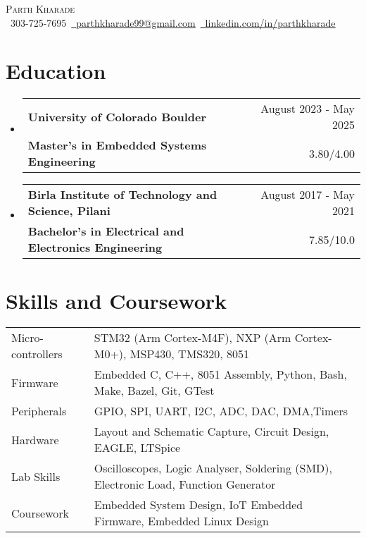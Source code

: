 \documentclass[11pt]{article}
\makeatletter
\newcommand{\resumeSubheading}[4]{
  \vspace{-2pt}\item
    \begin{tabular*}{1.0\textwidth}[t]{l@{\extracolsep{\fill}}r}
       {\large \textbf{#1}}&{\large #2} \\
      \textbf{#3}&{ #4} \\
    \end{tabular*}\vspace{-1pt}
}
\newcommand{\resumeSubHeadingListStart}{\begin{itemize}[leftmargin=0.0in, label={}]}
\newcommand{\resumeSubHeadingListEnd}{\end{itemize}}
\makeatother
\begin{document}
\setlength{\footskip}{4.1pt}
\begin{center}
  {\huge \scshape Parth Kharade} \\ \vspace{1pt}
  \small \raisebox{-0.1\height}\faPhone\ 303-725-7695{\hspace{0.1cm}}~\href{mailto:parthkharade99@gmail.com}{\raisebox{-0.2\height}\faEnvelope\ \underline{parthkharade99@gmail.com}}~{\hspace{0.1cm}}\href{https://www.linkedin.com/in/parth-k-081287184/}{\raisebox{-0.2\height}\faLinkedin\ \underline{linkedin.com/in/parthkharade}}
  \vspace{-10pt}
\end{center}


\section {Education}
\resumeSubHeadingListStart
\resumeSubheading
{University of Colorado Boulder}{August 2023 - May 2025}
{Master's in Embedded Systems Engineering}{3.80/4.00}
\vspace{-0.1in}
\resumeSubheading
{Birla Institute of Technology and Science, Pilani}{August 2017 - May 2021}
{Bachelor's in Electrical and Electronics Engineering}{7.85/10.0}
\resumeSubHeadingListEnd
\vspace{-16pt}
\section{Skills and Coursework}
\vspace{-4mm}
\begin{table}[!htb]
  \begin{tabular} { m{3.1cm} | m{16cm} }
    {Micro-controllers} & {\: STM32 (Arm Cortex-M4F), NXP (Arm Cortex-M0+), MSP430, TMS320, 8051}                  \\
    {Firmware}          & {\: Embedded C, C++, 8051 Assembly, Python, Bash, Make, Bazel, Git, GTest}               \\
    {Peripherals}       & {\: GPIO, SPI, UART, I2C, ADC, DAC, DMA,Timers}                                          \\
    {Hardware}          & {\: Layout and Schematic Capture, Circuit Design, EAGLE, LTSpice}                        \\
    {Lab Skills}        & {\: Oscilloscopes, Logic Analyser, Soldering (SMD), Electronic Load, Function Generator} \\
    {Coursework}        & {\: Embedded System Design, IoT Embedded Firmware, Embedded Linux Design}                \\
  \end{tabular}
\end{table}
\vspace{-16pt}
\end{document}
